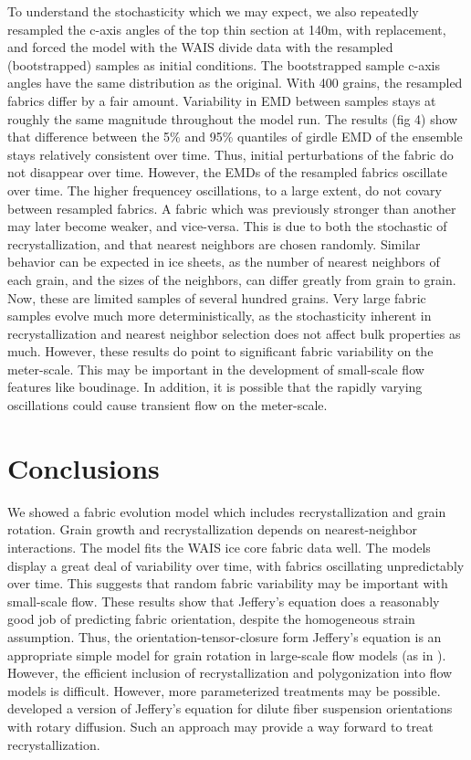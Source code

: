 \documentclass{igs}
\begin{document}
To understand the stochasticity which we may expect, we also repeatedly resampled the c-axis angles of the top thin section at 140m, with replacement, and forced the model with the WAIS divide data with the resampled (bootstrapped) samples as initial conditions. The bootstrapped sample c-axis angles have the same distribution as the original. With 400 grains, the resampled fabrics differ by a fair amount. Variability in EMD between samples stays at roughly the same magnitude throughout the model run. The results (fig 4) show that difference between the 5\% and 95\% quantiles of girdle EMD of the ensemble stays relatively consistent over time. Thus, initial perturbations of the fabric do not disappear over time.  However, the EMDs of the resampled fabrics oscillate over time. The higher frequencey oscillations, to a large extent, do not covary between resampled fabrics. A fabric which was previously stronger than another may later become weaker, and vice-versa. This is due to both the stochastic of recrystallization, and that nearest neighbors are chosen randomly. Similar behavior can be expected in ice sheets, as the number of nearest neighbors of each grain, and the sizes of the neighbors, can differ greatly from grain to grain. Now, these are limited samples of several hundred grains. Very large fabric samples evolve much more deterministically, as the stochasticity inherent in recrystallization and nearest neighbor selection does not affect bulk properties as much. However, these results do point to significant fabric variability on the meter-scale. This may be important in the development of small-scale flow features like boudinage. In addition, it is possible that the rapidly varying oscillations could cause transient flow on the meter-scale. 

\section{Conclusions}
We showed a fabric evolution model which includes recrystallization and grain rotation. Grain growth and recrystallization depends on nearest-neighbor interactions. The model fits the WAIS ice core fabric data well. The models display a great deal of variability over time, with fabrics oscillating unpredictably over time. This suggests that random fabric variability may be important with small-scale flow. These results show that Jeffery's equation does a reasonably good job of predicting fabric orientation, despite the homogeneous strain assumption. Thus, the orientation-tensor-closure form  Jeffery's equation is an appropriate simple model for grain rotation in large-scale flow models (as in \citet{gillet2006}). However, the efficient inclusion of recrystallization and polygonization into flow models is difficult. However, more parameterized treatments may be possible. \citet{folgar1984} developed a version of Jeffery's equation for dilute fiber suspension orientations with rotary diffusion. Such an approach may provide a way forward to treat recrystallization. 
\end{document}
